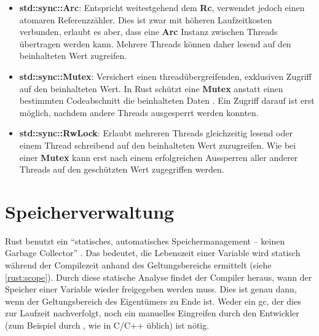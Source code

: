 \begin{itemize}
	\item \textbf{std::sync::Arc}: Entspricht weitestgehend dem \textbf{Rc}, verwendet jedoch einen atomaren Referenzzähler.
	Dies ist zwar mit höheren Laufzeitkosten verbunden, erlaubt es aber, dass eine \textbf{Arc} Instanz zwischen Threads übertragen werden kann.
	Mehrere Threads können daher lesend auf den beinhalteten Wert zugreifen.
	
	\item \textbf{std::sync::Mutex}: Versichert einen threadübergreifenden, exklusiven Zugriff auf den beinhalteten Wert.
	In Rust schützt eine \textbf{Mutex} anstatt einen bestimmten Codeabschnitt die beinhalteten Daten \cite[486]{rust:orly_programming}.
	Ein Zugriff darauf ist erst möglich, nachdem andere Threads ausgesperrt werden konnten.
	
	\item \textbf{std::sync::RwLock}: Erlaubt mehreren Threads gleichzeitig lesend oder einem Thread schreibend auf den beinhalteten Wert zuzugreifen. Wie bei einer \textbf{Mutex} kann erst nach einem erfolgreichen Aussperren aller anderer Threads auf den geschützten Wert zugegriffen werden.
	
	
\end{itemize}


\section{Speicherverwaltung}
\label{rust:scope}
\label{rust:static_analysis}

Rust benutzt ein \enquote{statisches, automatisches Speichermanagement -- keinen Garbage Collector} \cite{rust:youtube:goto2017}.
Das bedeutet, die Lebenszeit einer Variable wird statisch während der Compilezeit anhand des Geltungsbereichs ermittelt (siehe \autoref{rust:scope}).
Durch diese statische Analyse findet der Compiler heraus, wann der Speicher einer Variable wieder freigegeben werden muss.
Dies ist genau dann, wenn der Geltungsbereich des Eigentümers zu Ende ist.
Weder ein \gls{gc}, der dies zur Laufzeit nachverfolgt, noch ein manuelles Eingreifen durch den Entwickler (zum Beispiel durch , wie in C/C++ üblich) ist nötig.

